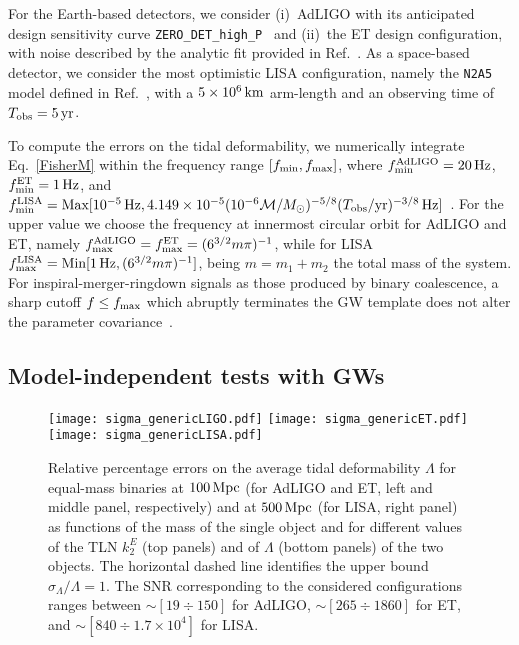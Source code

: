 \documentclass[aps,twocolumn,showpacs,preprintnumbers,nofootinbib,prd,superscriptaddress,groupedaddress,10pt]{revtex4-1}
\newcommand{\tn}{\textnormal}
\begin{document}
For the Earth-based detectors, we consider (i)~AdLIGO with its anticipated design sensitivity curve 
\texttt{ZERO\_DET\_high\_P}~\cite{zerodet} and (ii)~the ET design configuration, with noise described by the analytic fit 
provided in Ref.~\cite{Sathyaprakash:2009xs}. As a space-based detector, we consider the most optimistic LISA configuration, namely the \texttt{N2A5} model defined in Ref.~\cite{PhysRevD.93.024003}, with a $5\times 10^6\,{\rm km}$ arm-length and an observing time of $T_\tn{obs}=5\,{\rm yr}$.

To compute the errors on the tidal deformability, we numerically integrate Eq.~\eqref{FisherM} within 
the frequency range $[f_\tn{min},f_\tn{max}]$, where $f^\tn{AdLIGO}_\tn{min}=20\,{\rm Hz}$, 
$f^\tn{ET}_\tn{min}=1\,{\rm Hz}$, and $f^\tn{LISA}_\tn{min}=\tn{Max}[10^{-5}\,{\rm Hz},4.149\times 10^{-5}
(10^{-6}{\cal M}/M_\odot)^{-5/8}(T_\tn{obs}/{\rm yr})^{-3/8}\,{\rm Hz}]$~\cite{PhysRevD.71.084025}. 
For the upper value we choose the frequency at innermost circular orbit for AdLIGO and ET, 
namely $f^\tn{AdLIGO}_{\tn{max}}=f^\tn{ET}_{\tn{max}}=(6^{3/2} m \pi)^{-1}$,
while for LISA $f^\tn{LISA}_\tn{max}=\tn{Min}[1\,{\rm Hz},(6^{3/2} m \pi)^{-1}]$, being $m=m_1+m_2$ the 
total mass of the system. For inspiral-merger-ringdown signals as those produced by binary coalescence, a sharp cutoff $f\leq f_\tn{max}$ which abruptly terminates the GW template does not alter the parameter covariance~\cite{Mandel:2014tca}.

\subsection{Model-independent tests with GWs}
%
\begin{figure*}[th]
\centering
\texttt{[image: sigma\_genericLIGO.pdf]}
\texttt{[image: sigma\_genericET.pdf]}
\texttt{[image: sigma\_genericLISA.pdf]}
\caption{Relative percentage errors on the average tidal deformability $\Lambda$ for equal-mass binaries at $100\,{\rm Mpc}$ (for AdLIGO and ET, left and middle panel, respectively) and at $500\,{\rm Mpc}$ (for LISA, right panel) as functions of the mass of the single object and for different values of the TLN $k_2^E$ (top panels) and of $\Lambda$ (bottom panels) of the two objects. The horizontal dashed line identifies the upper 
bound $\sigma_\Lambda/\Lambda=1$. The SNR corresponding to the considered configurations ranges between  $\sim[19\div 150]$ for AdLIGO, $\sim[265\div 1860]$ for ET, and $\sim[840\div 1.7\times 10^4]$ for LISA.}
\label{fig:detectabilitygeneric}
\end{figure*}
%
\end{document}

